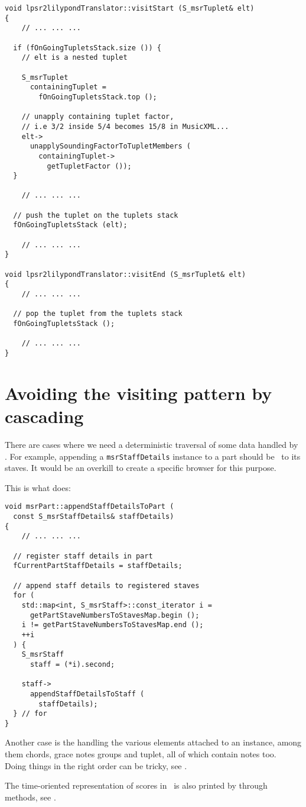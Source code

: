 \begin{lstlisting}[language=CPlusPlus]
void lpsr2lilypondTranslator::visitStart (S_msrTuplet& elt)
{
	// ... ... ...

  if (fOnGoingTupletsStack.size ()) {
    // elt is a nested tuplet

    S_msrTuplet
      containingTuplet =
        fOnGoingTupletsStack.top ();

    // unapply containing tuplet factor,
    // i.e 3/2 inside 5/4 becomes 15/8 in MusicXML...
    elt->
      unapplySoundingFactorToTupletMembers (
        containingTuplet->
          getTupletFactor ());
  }

	// ... ... ...

  // push the tuplet on the tuplets stack
  fOnGoingTupletsStack (elt);

	// ... ... ...
}

void lpsr2lilypondTranslator::visitEnd (S_msrTuplet& elt)
{
	// ... ... ...

  // pop the tuplet from the tuplets stack
  fOnGoingTupletsStack ();

	// ... ... ...
}
\end{lstlisting}


\section{Avoiding the visiting pattern by cascading}

There are cases where we need a deterministic traversal of some data handled by \mf. For example, appending a {\tt msrStaffDetails} instance to a part should be \cascaded\ to its staves. It would be an overkill to create a specific browser for this purpose.

This is what  does:
\begin{lstlisting}[language=CPlusPlus]
void msrPart::appendStaffDetailsToPart (
  const S_msrStaffDetails& staffDetails)
{
	// ... ... ...

  // register staff details in part
  fCurrentPartStaffDetails = staffDetails;

  // append staff details to registered staves
  for (
    std::map<int, S_msrStaff>::const_iterator i =
      getPartStaveNumbersToStavesMap.begin ();
    i != getPartStaveNumbersToStavesMap.end ();
    ++i
  ) {
    S_msrStaff
      staff = (*i).second;

    staff->
      appendStaffDetailsToStaff (
        staffDetails);
  } // for
}
\end{lstlisting}

Another case is the handling the various elements attached to an  instance, among them chords, grace notes groups and tuplet, all of which contain notes too. \\
Doing things in the right order can be tricky, see .

The time-oriented representation of scores in \msrRepr\ is also printed by \cascading through  methods, see .
